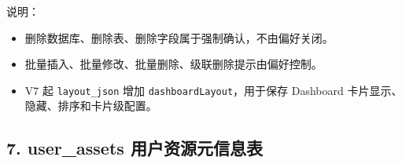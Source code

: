 \documentclass[
  a4paper,
  UTF8]{ctexart}
\providecommand{\tightlist}{%
  \setlength{\itemsep}{0pt}\setlength{\parskip}{0pt}}
\begin{document}
说明：

\begin{itemize}
\tightlist
\item
  删除数据库、删除表、删除字段属于强制确认，不由偏好关闭。
\item
  批量插入、批量修改、批量删除、级联删除提示由偏好控制。
\item
  V7 起 \texttt{layout\_json} 增加 \texttt{dashboardLayout}，用于保存
  Dashboard 卡片显示、隐藏、排序和卡片级配置。
\end{itemize}

\hypertarget{user_assets-ux7528ux6237ux8d44ux6e90ux5143ux4fe1ux606fux8868}{%
\subsection{7. user\_assets
用户资源元信息表}\label{user_assets-ux7528ux6237ux8d44ux6e90ux5143ux4fe1ux606fux8868}}
\end{document}
